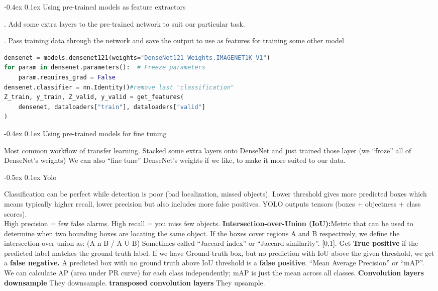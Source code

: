 \documentclass[8pt,landscape]{article}
\makeatletter
\renewcommand{\section}{\@startsection{section}{1}{0pt}%
    {-0.5ex}%
    {0.1ex}%
    {\fontsize{8}{9}\bfseries\color{red}}}
\renewcommand{\subsection}{\@startsection{subsection}{2}{0pt}%
    {-0.4ex}%
    {0.1ex}%
    {\fontsize{8}{9}\bfseries\color{blue}}}
\newcommand{\smalltext}[1]{%
  {\fontsize{8}{9}\selectfont\sloppy #1\par}%
}
\makeatother
\begin{document}
\begin{multicols}{3}
\subsection{Using pre-trained models as feature extractors}
\smalltext{
1. Add some extra layers to the pre-trained network to suit our particular task.
}
\smalltext{
2. Pass training data through the network and save the output to use as features for training some other model
}


\begin{lstlisting}[language=Python]
densenet = models.densenet121(weights="DenseNet121_Weights.IMAGENET1K_V1")
for param in densenet.parameters():  # Freeze parameters
    param.requires_grad = False
densenet.classifier = nn.Identity()#remove last "classification"
Z_train, y_train, Z_valid, y_valid = get_features(
    densenet, dataloaders["train"], dataloaders["valid"]
)
\end{lstlisting}
    
\subsection{Using pre-trained models for fine tuning}
\smalltext{
Most common workflow of transfer learning.
Stacked some extra layers onto DenseNet and just trained those layer (we “froze” all of DenseNet's weights)
We can also “fine tune” DenseNet's weights if we like, to make it more suited to our data.    
}

\section{Yolo}
\smalltext{
Classification can be perfect while detection is poor (bad localization, missed objects).
Lower threshold gives more predicted boxes which means typically higher recall, lower precision but also includes more false positives.
YOLO outputs tensors (boxes + objectness + class scores). \\
High precision = few false alarms.
High recall = you miss few objects.
\textbf{Intersection-over-Union (IoU):}Metric that can be used to determine when two bounding boxes are locating the same object.
If the boxes cover regions A and B respectively, we define the intersection-over-union as: (A n B / A U B) Sometimes called “Jaccard index” or “Jaccard similarity”. [0,1].
Get \textbf{True positive} if the predicted label matches the ground truth label.
If we have Ground-truth box, but no prediction with IoU above the given threshold, we get a \textbf{false negative.}
A predicted box with no ground truth above IoU threshold is a \textbf{false positive}.
“Mean Average Precision” or “mAP”. We can calculate AP (area under PR curve) for each class independently; mAP is just the mean across all classes.
\textbf{Convolution layers downsample} They downsample.
\textbf{transposed convolution layers} They upsample.
}




\end{multicols}
\end{document}
